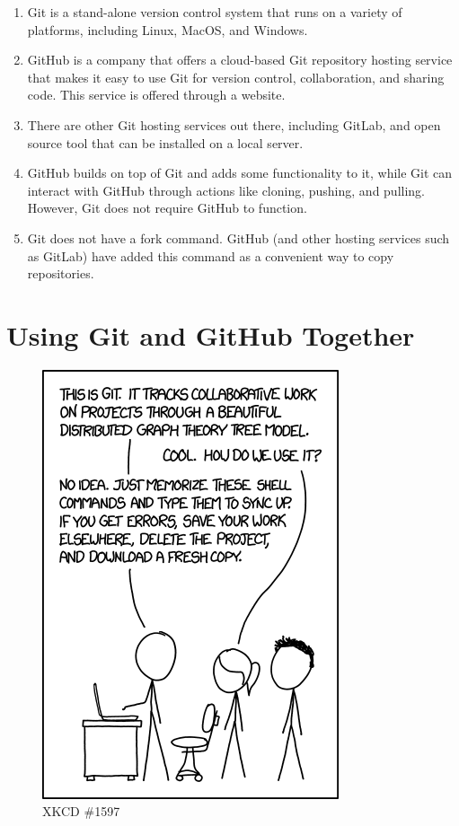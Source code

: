 \documentclass[
  letterpaper,
  DIV=11,
  numbers=noendperiod]{scrreport}
\providecommand{\tightlist}{%
  \setlength{\itemsep}{0pt}\setlength{\parskip}{0pt}}\usepackage{longtable,booktabs,array}
\begin{document}
\begin{enumerate}
\def\labelenumi{\arabic{enumi}.}
\tightlist
\item
  Git is a stand-alone version control system that runs on a variety of
  platforms, including Linux, MacOS, and Windows.
\item
  GitHub is a company that offers a cloud-based Git repository hosting
  service that makes it easy to use Git for version control,
  collaboration, and sharing code. This service is offered through a
  website.
\item
  There are other Git hosting services out there, including GitLab, and
  open source tool that can be installed on a local server.
\item
  GitHub builds on top of Git and adds some functionality to it, while
  Git can interact with GitHub through actions like cloning, pushing,
  and pulling. However, Git does not require GitHub to function.
\item
  Git does not have a fork command. GitHub (and other hosting services
  such as GitLab) have added this command as a convenient way to copy
  repositories.
\end{enumerate}

\hypertarget{using-git-and-github-together}{%
\section{Using Git and GitHub
Together}\label{using-git-and-github-together}}

\begin{figure}

{\centering \includegraphics{modules/../media/xkcd-git.png}

}

\caption{XKCD \#1597}

\end{figure}
\end{document}
